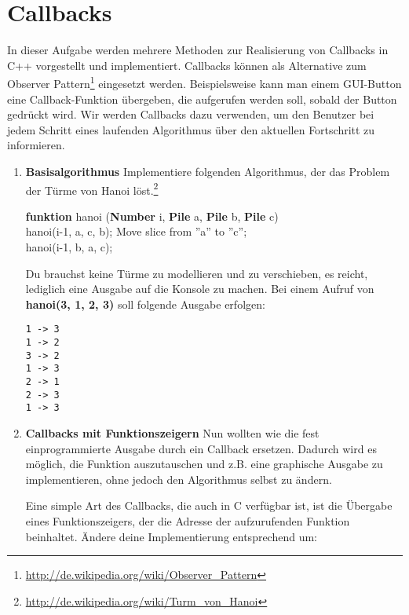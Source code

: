 \section{Callbacks}
In dieser Aufgabe werden mehrere Methoden zur Realisierung von Callbacks in C++ vorgestellt und implementiert. 
Callbacks können als Alternative zum Observer Pattern\footnote{\url{http://de.wikipedia.org/wiki/Observer_Pattern}} eingesetzt werden.
Beispielsweise kann man einem GUI-Button eine Callback-Funktion übergeben, die aufgerufen werden soll, sobald der Button gedrückt wird.
Wir werden Callbacks dazu verwenden, um den Benutzer bei jedem Schritt eines laufenden Algorithmus über den aktuellen Fortschritt zu informieren.

\begin{enumerate}

\item \textbf{Basisalgorithmus}
Implementiere folgenden Algorithmus, der das Problem der Türme von Hanoi löst.\footnote{\url{http://de.wikipedia.org/wiki/Turm_von_Hanoi}} \\
\begin{algorithm}[H]
 \SetAlgoLined
 \textbf{funktion} hanoi (\textbf{Number} i, \textbf{Pile} a, \textbf{Pile} b, \textbf{Pile} c) { \\
      {
        hanoi(i-1, a, c, b); 
        Move slice from ''a'' to ''c''; \\
        hanoi(i-1, b, a, c); 
     }
 }
\end{algorithm}

Du brauchst keine Türme zu modellieren und zu verschieben, es reicht, lediglich eine Ausgabe auf die Konsole zu machen. Bei einem Aufruf von \textbf{hanoi(3, 1, 2, 3)} soll folgende Ausgabe erfolgen:
\begin{lstlisting}
1 -> 3
1 -> 2
3 -> 2
1 -> 3
2 -> 1
2 -> 3
1 -> 3
\end{lstlisting}

\item \textbf{Callbacks mit Funktionszeigern}
Nun wollten wie die fest einprogrammierte Ausgabe durch ein Callback ersetzen. Dadurch wird es möglich, die Funktion auszutauschen und z.B. eine graphische Ausgabe zu implementieren, ohne jedoch den Algorithmus selbst zu ändern.

Eine simple Art des Callbacks, die auch in C verfügbar ist, ist die Übergabe eines Funktionszeigers, der die Adresse der aufzurufenden Funktion beinhaltet.
Ändere deine Implementierung entsprechend um:


\end{enumerate}
